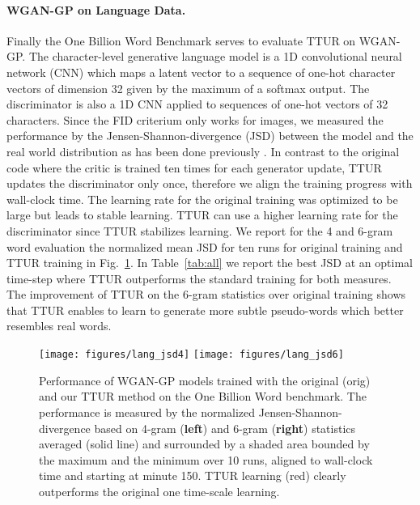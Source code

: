 \documentclass{article}
\begin{document}
\paragraph{WGAN-GP on Language Data.}

Finally the One Billion Word Benchmark \cite{Chelba:13} serves to evaluate TTUR
on WGAN-GP.
The character-level generative language model is a 1D convolutional neural
network (CNN) which maps a latent vector to a sequence of one-hot character
vectors of dimension 32 given by the maximum of a softmax output.
The discriminator is also a 1D CNN applied to sequences of one-hot vectors of 32
characters.
Since the FID criterium only works for images, we measured the performance by
the Jensen-Shannon-divergence (JSD) between the model and the real world
distribution as has been done previously \cite{Gulrajani:17}.
In contrast to the original code where the critic is trained ten times for each
generator update, TTUR updates the discriminator only once, therefore we align
the training progress with wall-clock time. The learning rate for the original
training was optimized to be large but leads to stable learning. TTUR can use a
higher learning rate for the discriminator since TTUR stabilizes learning.
We report for the 4 and 6-gram word evaluation the normalized mean JSD for ten
runs for original training and TTUR training in Fig.~\ref{fig:lang}. In
Table~\ref{tab:all} we report the best JSD at an optimal time-step where TTUR
outperforms the standard training for both  measures. The improvement of TTUR on
the 6-gram statistics over original training shows that TTUR enables to
learn to generate more subtle pseudo-words which better resembles real words.

\begin{figure} \centering
\texttt{[image: figures/lang\_jsd4]}
\texttt{[image: figures/lang\_jsd6]}
\caption[Performance of WGAN-GP on One Billion Word.]{Performance of
WGAN-GP models trained with the original (orig) and our TTUR
method on the One Billion Word benchmark.
The performance is measured by
the normalized Jensen-Shannon-divergence based on 4-gram ({\bf left}) and
 6-gram ({\bf right}) statistics averaged (solid line) and surrounded
 by a shaded area bounded by the maximum and the minimum
over 10 runs, aligned to wall-clock
time and starting at minute 150. TTUR learning (red) clearly
outperforms the
original one time-scale learning.}
\label{fig:lang}
\end{figure}
\end{document}
